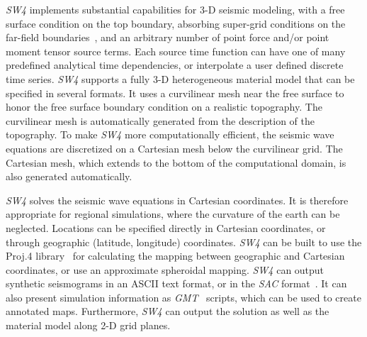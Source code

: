 \documentclass[11pt]{report}
\begin{document}
\emph{SW4} implements substantial capabilities for 3-D seismic modeling, with a free surface
condition on the top boundary, absorbing super-grid conditions on the far-field
boundaries~\cite{PetSjo-13}, and an arbitrary number of point force and/or point moment tensor
source terms. Each source time function can have one of many predefined analytical time
dependencies, or interpolate a user defined discrete time series. \emph{SW4} supports a fully 3-D
heterogeneous material model that can be specified in several formats. It uses a curvilinear mesh
near the free surface to honor the free surface boundary condition on a realistic topography. The
curvilinear mesh is automatically generated from the description of the topography. To make
\emph{SW4} more computationally efficient, the seismic wave equations are discretized on a Cartesian
mesh below the curvilinear grid. The Cartesian mesh, which extends to the bottom of the
computational domain, is also generated automatically.

\emph{SW4} solves the seismic wave equations in Cartesian coordinates. It is therefore appropriate
for regional simulations, where the curvature of the earth can be neglected. Locations can be
specified directly in Cartesian coordinates, or through geographic (latitude, longitude)
coordinates. \emph{SW4} can be built to use the Proj.4 library~\cite{Proj4} for calculating the
mapping between geographic and Cartesian coordinates, or use an approximate spheroidal
mapping. \emph{SW4} can output synthetic seismograms in an ASCII text format, or in the \emph{SAC}
format~\cite{Goldstein-et-al}. It can also present simulation information as
\emph{GMT}~\cite{WesselSmithGMT} scripts, which can be used to create annotated maps. Furthermore,
\emph{SW4} can output the solution as well as the material model along 2-D grid planes.

\end{document}
